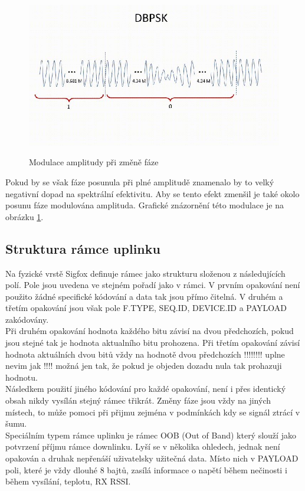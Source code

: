 \documentclass{ctuthesis}
\begin{document}
\begin{figure}
\caption{Modulace amplitudy při změně fáze \cite{sigfoxprotocol}}
\includegraphics[width=1\textwidth]{./images/dbpsk_sigfox.jpg}
\label{dbpsk_sigfox}
\end{figure}
Pokud by se však fáze posunula při plné amplitudě znamenalo by to velký negativní dopad na spektrální efektivitu. Aby se tento efekt zmenšil je také okolo posunu fáze modulována amplituda. Grafické znázornění této modulace je na obrázku \ref{dbpsk_sigfox}.\\

\subsection{Struktura rámce uplinku}
Na fyzické vrstě Sigfox definuje rámec jako strukturu složenou z následujících polí. Pole jsou uvedena ve stejném pořadí jako v rámci. V prvním opakování není použito žádné specifické kódování a data tak jsou přímo čitelná. V druhém a třetím opakování jsou však pole F.TYPE, SEQ.ID, DEVICE.ID a PAYLOAD zakódovány.\\
Při druhém opakování hodnota každého bitu závisí na dvou předchozích, pokud jsou stejné tak je hodnota aktualního bitu prohozena. Při třetím opakování závisí hodnota aktuálních dvou bitů vždy na hodnotě dvou předchozích !!!!!!!! uplne nevim jak !!!! možná jen tak, že pokud je objeden dozadu nula tak prohazuji hodnotu.\\
Následkem použití jiného kódování pro každé opakování, není i přes identický obsah nikdy vysílán stejný rámec třikrát. Změny fáze jsou vždy na jiných místech, to může pomoci při přijmu zejména v podmínkách kdy se signál ztrácí v šumu.\\
Speciálním typem rámce uplinku je rámec OOB (Out of Band) který slouží jako potvrzení příjmu rámce downlinku. Lyší se v několika ohledech, jednak není opakován a druhak nepřenáší uživatelsky užitečná data. Místo nich v PAYLOAD poli, které je vždy dlouhé 8 bajtů, zasílá informace o napětí během nečinosti i během vysílání, teplotu, RX RSSI.
\end{document}
